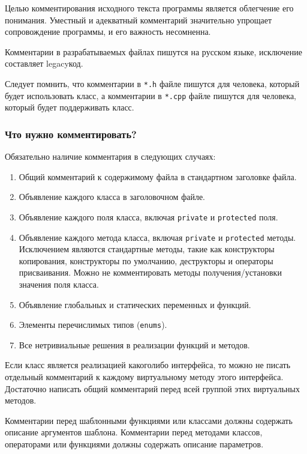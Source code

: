 Целью комментирования исходного текста программы является облегчение его понимания. Уместный и адекватный комментарий значительно упрощает сопровождение программы, и его важность несомненна.

Комментарии в разрабатываемых файлах пишутся на русском языке, исключение составляет legacy\sdash код.

Следует помнить, что комментарии в \lstinline|*.h| файле пишутся для человека, который будет использовать класс, а комментарии в \lstinline|*.cpp| файле пишутся для человека, который будет поддерживать класс.

\subsubsection{Что нужно комментировать?}

Обязательно наличие комментария в следующих случаях:

\begin{enumerate}
\item Общий комментарий к содержимому файла в стандартном заголовке файла.
\item Объявление каждого класса в заголовочном файле.
\item Объявление каждого поля класса, включая \lstinline|private| и \lstinline|protected| поля.
\item Объявление каждого метода класса, включая \lstinline|private| и \lstinline|protected| методы. Исключением являются стандартные методы, такие как конструкторы копирования, конструкторы по умолчанию, деструкторы и операторы присваивания. Можно не комментировать методы получения/установки значения поля класса.
\item Объявление глобальных и статических переменных и функций.
\item Элементы перечислимых типов (\lstinline|enums|).
\item Все нетривиальные решения в реализации функций и методов.
\end{enumerate}
Если класс является реализацией какого\sdash либо интерфейса, то можно не писать отдельный комментарий к каждому виртуальному методу этого интерфейса. Достаточно написать общий комментарий перед всей группой этих виртуальных методов.

Комментарии перед шаблонными функциями или классами должны содержать описание аргументов шаблона. Комментарии перед методами классов, операторами или функциями должны содержать описание параметров.

